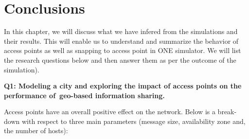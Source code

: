 
\chapter{Conclusions}\label{chapter:conclusions}
In this chapter, we will discuss what we have infered from the simulations and their results. This will enable us to understand and summarize the behavior of access points as well as snapping to access point in ONE simulator. We will list the research questions below and then answer them as per the outcome of the simulation).\newline

\textbf{Q1: Modeling a city and exploring the impact of access points on the performance of geo-based information sharing.} \newline

Access points have an overall positive effect on the network. Below is a break-down with respect to three main parameters (message size, availability zone and, the number of hosts):

